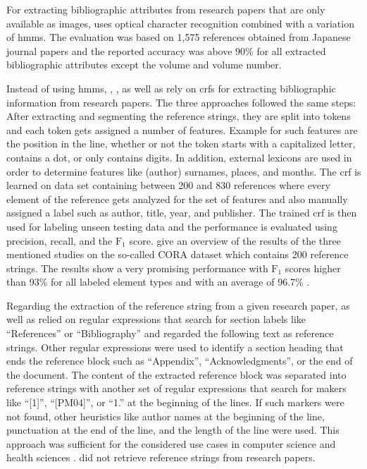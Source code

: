 For extracting bibliographic attributes from research papers that are only available as images, \citet{takasu2003bibliographic} uses optical character recognition combined with a variation of \glspl{hmm}. The evaluation was based on 1,575 references obtained from Japanese journal papers and the reported accuracy was above 90\% for all extracted bibliographic attributes except the volume and volume number.

Instead of using \glspl{hmm}, \citet{peng2004accurate}, \citet{councill2008parscit}, as well as \citet{groza2012reference} rely on \glspl{crf} for extracting bibliographic information from research papers. The three approaches followed the same steps: After extracting and segmenting the reference strings, they are split into tokens and each token gets assigned a number of features. Example for such features are the position in the line, whether or not the token starts with a capitalized letter, contains a dot, or only contains digits. In addition, external lexicons are used in order to determine features like (author) surnames, places, and months. The \gls{crf} is learned on data set containing between 200 and 830 references where every element of the reference gets analyzed for the set of features and also manually assigned a label such as author, title, year, and publisher. The trained \gls{crf} is then used for labeling unseen testing data and the performance is evaluated using precision, recall, and the $\text{F}_1$ score. \citet{groza2012reference} give an overview of the results of the three mentioned studies on the so-called CORA dataset which contains 200 reference strings. The results show a very promising performance with $\text{F}_1$ scores higher than 93\% for all labeled element types and with an average of 96.7\% \citep{groza2012reference}.

Regarding the extraction of the reference string from a given research paper, \citet{councill2008parscit} as well as \citet{groza2012reference} relied on regular expressions that search for section labels like ``References'' or ``Bibliography'' and regarded the following text as reference strings. Other regular expressions were used to identify a section heading that ends the reference  block such as ``Appendix'', ``Acknowledgments'', or the end of the document. The content of the extracted reference block was separated into reference strings with another set of regular expressions that search for makers like ``[1]'', ``[PM04]'', or ``1.'' at the beginning of the lines. If such markers were not found, other heuristics like author names at the beginning of the line, punctuation at the end of the line, and the length of the line were used. This approach was sufficient for the considered use cases in computer science and health sciences \citep{councill2008parscit,groza2012reference}. \citet{peng2004accurate} did not retrieve reference strings from research papers.\\

